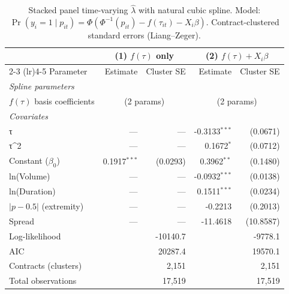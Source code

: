 \begin{table}[H]
\centering
\small
\caption{Stacked panel time-varying $\hat{\lambda}$ with natural cubic spline. Model: $\Pr(y_i = 1 \mid p_{it}) = \Phi(\Phi^{-1}(p_{it}) - f(\tau_{it}) - X_i\beta)$. Contract-clustered standard errors (Liang--Zeger).}
\label{tab:stacked_panel}
\begin{tabular}{lrrrr}
\toprule
 & \multicolumn{2}{c}{(1) $f(\tau)$ only} & \multicolumn{2}{c}{(2) $f(\tau) + X_i\beta$} \\
\cmidrule(lr){2-3} \cmidrule(lr){4-5}
Parameter & Estimate & Cluster SE & Estimate & Cluster SE \\
\midrule
\textit{Spline parameters} & & & & \\
$f(\tau)$ basis coefficients & \multicolumn{2}{c}{(2 params)} & \multicolumn{2}{c}{(2 params)} \\
\midrule
\textit{Covariates} & & & & \\
τ & --- & --- & -0.3133$^{***}$ & (0.0671) \\
τ^2 & --- & --- & 0.1672$^{*}$ & (0.0712) \\
Constant ($\beta_0$) & 0.1917$^{***}$ & (0.0293) & 0.3962$^{**}$ & (0.1480) \\
ln(Volume) & --- & --- & -0.0932$^{***}$ & (0.0138) \\
ln(Duration) & --- & --- & 0.1511$^{***}$ & (0.0234) \\
$|p - 0.5|$ (extremity) & --- & --- & -0.2213 & (0.2013) \\
Spread & --- & --- & -11.4618 & (10.8587) \\
\midrule
Log-likelihood & \multicolumn{2}{r}{-10140.7} & \multicolumn{2}{r}{-9778.1} \\
AIC & \multicolumn{2}{r}{20287.4} & \multicolumn{2}{r}{19570.1} \\
Contracts (clusters) & \multicolumn{2}{r}{2,151} & \multicolumn{2}{r}{2,151} \\
Total observations & \multicolumn{2}{r}{17,519} & \multicolumn{2}{r}{17,519} \\
\bottomrule
\end{tabular}
\end{table}